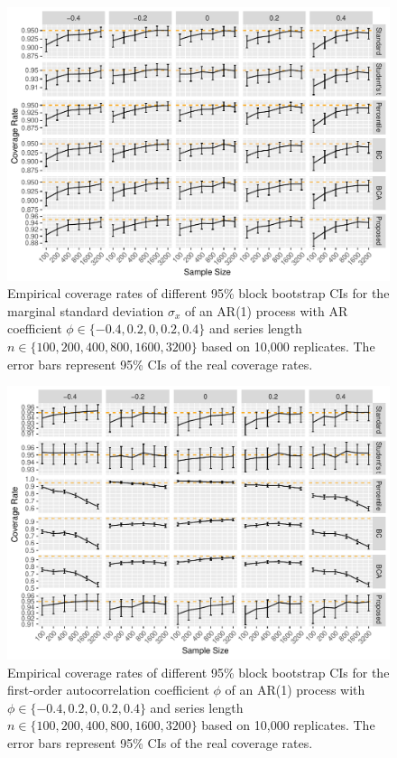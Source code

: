 \documentclass[12pt, letterpaper, titlepage]{article}
\begin{document}
\begin{figure}[tbp]
  \centering
  \includegraphics[width=\textwidth]{figures/plot_norm_sigma}
  \caption{Empirical coverage rates of different 95\% block bootstrap CIs for
    the marginal standard deviation $\sigma_x$ of an AR(1) 
		process with AR
    coefficient $\phi \in \{-0.4, 0.2, 0, 0.2, 0.4\}$ and series length
    $n \in \{100, 200, 400, 800, 1600, 3200\}$ based on 10,000 replicates.
    The error bars represent 95\% CIs of the real coverage rates.}
  \label{fig:sigma}
\end{figure}


\begin{figure}[tbp]
  \centering
  \includegraphics[width=\textwidth]{figures/plot_norm_phi}
  \caption{Empirical coverage rates of different 95\% block bootstrap CIs for
    the first-order autocorrelation coefficient $\phi$ of an AR(1) process with
    $\phi \in \{-0.4, 0.2, 0, 0.2, 0.4\}$ and series length
    $n \in \{100, 200, 400, 800, 1600, 3200\}$ based on 10,000 replicates.
    The error bars represent 95\% CIs of the real coverage rates.}
  \label{fig:phi}
\end{figure}
\end{document}
